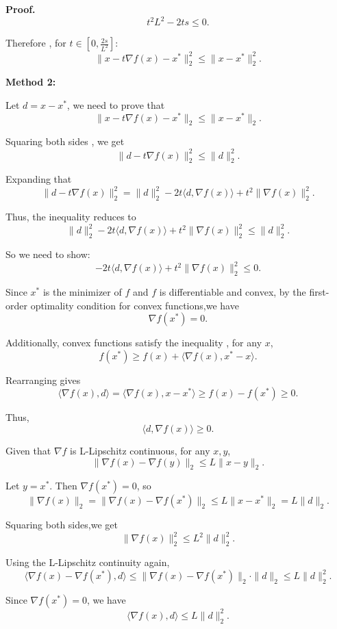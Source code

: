 \documentclass[a4paper, 11pt]{article}
\newenvironment{solution}
    {\textbf{Proof.}}
    {}
\begin{document}
\begin{solution}
$$
t^2 L^2 - 2ts \leq 0.
$$

Therefore , for \( t \in [0, \frac{2s}{L^2}]\): 
$$
\|x - t\nabla f(x) - x^*\|_2^2 \leq \|x - x^*\|_2^2.
$$ 

	\textbf{Method 2:}
	
	Let \(d = x - x^*\),  we need to prove that 
	$$\| x - t\nabla f(x) - x^* \|_2 \leq \| x - x^* \|_2.$$  
	
	Squaring both sides , we get  
	$$\| d - t\nabla f(x) \|_2^2 \leq \| d \|_2^2.$$  
	
	Expanding that 
	$$\| d - t\nabla f(x) \|_2^2 = \| d \|_2^2 - 2t\langle d, \nabla f(x) \rangle + t^2\|\nabla f(x)\|_2^2.$$  
	
	Thus, the inequality reduces to
	$$\| d \|_2^2 - 2t\langle d, \nabla f(x) \rangle + t^2\|\nabla f(x)\|_2^2 \leq \| d \|_2^2.$$  

	So we need to show:  
$$
	-2t \langle d, \nabla f(x) \rangle + t^2 \|\nabla f(x)\|_2^2 \leq 0.
$$
	
	Since \(x^*\) is the minimizer of \(f\) and \(f\) is differentiable and convex, by the first-order optimality condition for convex functions,we have  
	$$\nabla f(x^*) = 0.$$  
	
	Additionally, convex functions satisfy the inequality , for any \(x\),  
	$$f(x^*) \geq f(x) + \langle \nabla f(x), x^* - x \rangle.$$ 
	 
	Rearranging gives 
	$$\langle \nabla f(x), d \rangle = \langle \nabla f(x), x - x^* \rangle \geq f(x) - f(x^*) \geq 0.$$ 
	
	Thus, $$\langle d, \nabla f(x) \rangle \geq 0.$$
	
	Given that \(\nabla f\) is L-Lipschitz continuous, for any \(x, y\),
	$$\|\nabla f(x) - \nabla f(y)\|_2 \leq L\|x - y\|_2.$$  
	
	Let \(y = x^*\). Then \(\nabla f(x^*) = 0\), so
	$$\|\nabla f(x)\|_2 = \|\nabla f(x) - \nabla f(x^*)\|_2 \leq L\|x - x^*\|_2 = L\|d\|_2.$$
	  
	Squaring both sides,we get 
$$
	\|\nabla f(x)\|_2^2 \leq L^2\|d\|_2^2 .  
$$
	 
	Using the L-Lipschitz continuity again,
	$$\langle \nabla f(x) - \nabla f(x^*), d \rangle \leq \|\nabla f(x) - \nabla f(x^*)\|_2 \cdot \|d\|_2 \leq L\|d\|_2^2.$$  
	
	Since \(\nabla f(x^*) = 0\), we have
$$	
	\langle \nabla f(x), d \rangle \leq L\|d\|_2^2 . 
$$
	
\end{solution}
\end{document}
